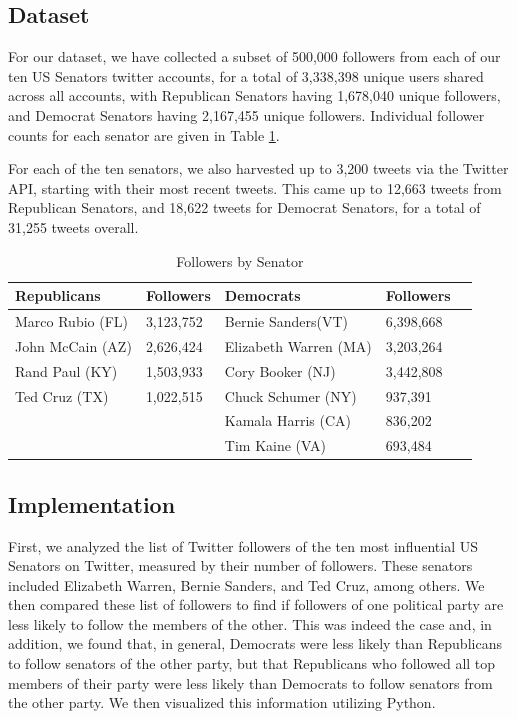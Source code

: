 \documentclass[journal]{IEEEtran}
\begin{document}
	\subsection{Dataset}
	
	For our dataset, we have collected a subset of 500,000 followers from each of our ten US Senators twitter accounts, for a total of 3,338,398 unique users shared across all accounts, with Republican Senators having 1,678,040 unique followers, and Democrat Senators having 2,167,455 unique followers. Individual follower counts for each senator are given in Table \ref{senatorTable}.
	
	For each of the ten senators, we also harvested up to 3,200 tweets via the Twitter API, starting with their most recent tweets. This came up to 12,663 tweets from Republican Senators, and 18,622 tweets for Democrat Senators, for a total of 31,255 tweets overall.
	
	\begin{table}[htp]
		\centering
		\caption{Followers by Senator}
		\label{senatorTable}
		\begin{tabular}{ll|lll}
			\hline
			Republicans & Followers & Democrats        & Followers &  \\ \hline
			Marco Rubio (FL) & 3,123,752 & Bernie Sanders(VT)   & 6,398,668 &  \\
			John McCain (AZ) & 2,626,424 & Elizabeth Warren (MA) & 3,203,264 &  \\
			Rand Paul (KY)   & 1,503,933 & Cory Booker (NJ)      & 3,442,808 &  \\
			Ted Cruz  (TX)  & 1,022,515 & Chuck Schumer (NY)   & 937,391   &  \\
			&           & Kamala Harris (CA)    & 836,202   &  \\
			&           & Tim Kaine (VA)        & 693,484   &  \\ \cline{1-5}
		\end{tabular}
	\end{table}
	
	\subsection{Implementation}
	
	First, we analyzed the list of Twitter followers of the ten most influential US Senators on Twitter, measured by their number of followers. These senators included Elizabeth Warren, Bernie Sanders, and Ted Cruz, among others. We then compared these list of followers to find if followers of one political party are less likely to follow the members of the other. This was indeed the case and, in addition, we found that, in general, Democrats were less likely than Republicans to follow senators of the other party, but that Republicans who followed all top members of their party were less likely than Democrats to follow senators from the other party. We then visualized this information utilizing Python.  
	
\end{document}
